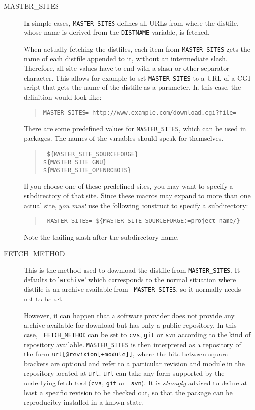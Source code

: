 \begin{description}
   \item[MASTER\_SITES] In simple cases, {\tt MASTER\_SITES}  defines all URLs
   from where the distfile, whose name is derived from the {\tt DISTNAME}
   variable, is fetched.

   When actually fetching the distfiles, each item from {\tt MASTER\_SITES}
   gets the name of each distfile appended to it, without an intermediate
   slash. Therefore, all site values have to end with a slash or other
   separator character. This allows for example to set {\tt MASTER\_SITES} to a
   URL of a CGI script that gets the name of the distfile as a parameter. In
   this case, the definition would look like:
   \begin{quote}
      {\tt MASTER\_SITES=   http://www.example.com/download.cgi?file=}
   \end{quote}

   There are some predefined values for {\tt MASTER\_SITES}, which can be used
   in packages. The names of the variables should speak for themselves.
   \begin{quote}\tt
      \$\{MASTER\_SITE\_SOURCEFORGE\}\\
      \$\{MASTER\_SITE\_GNU\}\\
      \$\{MASTER\_SITE\_OPENROBOTS\}
   \end{quote}

   If you choose one of these predefined sites, you may want to specify a
   subdirectory of that site. Since these macros may expand to more than one
   actual site, {\em you must} use the following construct to specify a
   subdirectory:
   \begin{quote}\tt
      MASTER\_SITES=~\$\{MASTER\_SITE\_SOURCEFORGE:=project\_name/\}
   \end{quote}
   Note the trailing slash after the subdirectory name.

   \smallbreak
   \item[FETCH\_METHOD] This is the method used to download the distfile from
   {\tt MASTER\_SITES}. It defaults to '{\tt archive}' which corresponds to the
   normal situation where distfile is an archive available from {\tt
   MASTER\_SITES}, so it normally needs not to be set.

   However, it can happen that a software provider does not provide any archive
   available for download but has only a public repository. In this case, {\tt
   FETCH\_METHOD} can be set to {\tt cvs}, {\tt git} or {\tt svn} according to
   the kind of repository available. {\tt MASTER\_SITES} is then interpreted as
   a repository of the form {\tt url[@revision[+module]]}, where the bits
   between square brackets are optional and refer to a particular revision and
   module in the repository located at {\tt url}. {\tt url} can take any form
   supported by the underlying fetch tool ({\tt cvs}, {\tt git} or {\tt
   svn}). It is {\em strongly} advised to define at least a specific revision
   to be checked out, so that the package can be reproducibly installed in a
   known state.

\end{description}
